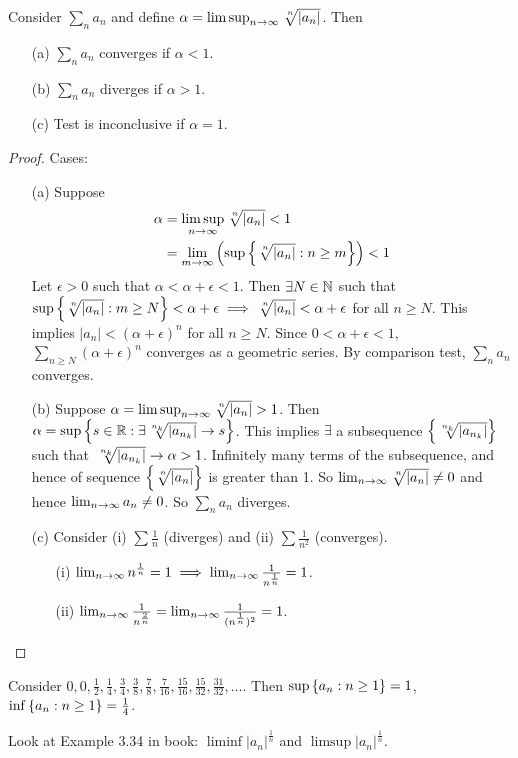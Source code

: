 \documentclass[]{article}
\begin{document}
\begin{theorem}
	 Consider $\sum_n a_n$ and define $\alpha = \limsup_{n\ra\infty} \nrt{n}{|a_n|}$.
	Then
	\begin{enumerate}
		\item[(a)] $\sum_n a_n$ converges if $\alpha<1$.
		\item[(b)] $\sum_n a_n$ diverges if $\alpha>1$.
		\item[(c)] Test is inconclusive if $\alpha = 1$.
	\end{enumerate}
\end{theorem}
\newpage
\begin{proof}
	Cases:
	\begin{enumerate}
		\item[(a)] Suppose 
			\begin{align*}
				\alpha &= \limsup_{n\ra\infty} \nrt{n}{|a_n|}<1 \\
					   &= \lim_{m\ra\infty}\left(\sup\setc{\nrt{n}{|a_n|}}{n\geq m} \right) < 1
			\end{align*}
			Let $\epsilon>0$ such that $\alpha < \alpha +\epsilon < 1$.
			Then $\exists N\in\mathbb{N}$ such that $\sup\setc{\nrt{n}{|a_n|}}{m\geq N} < \alpha+\epsilon \implies \nrt{n}{|a_n|}<\alpha+\epsilon$ for all $n\geq N$.
			This implies $|a_n|<(\alpha+\epsilon)^n$ for all $n\geq N$.
			Since $0<\alpha+\epsilon<1$, $\sum_{n\geq N}(\alpha+\epsilon)^n$ converges as a geometric series.
			By comparison test, $\sum_n a_n$ converges.
		\item[(b)] Suppose $\alpha = \limsup_{n\ra\infty} \nrt{n}{|a_n|} >1$.
			Then $\alpha = \sup\setc{s\in\mb R}{\exists \nrt{n_k}{|a_{n_k}|}\ra s}$.
			This implies $\exists$ a subsequence $\set{\nrt{n_k}{|a_{n_k}|}}$ such that $\nrt{n_k}{|a_{n_k}|}\ra \alpha > 1$.
			Infinitely many terms of the subsequence, and hence of sequence $\set{\nrt{n}{|a_n|}}$ is greater than 1.
			So $\lim_{n\ra\infty}\nrt{n}{|a_n|}\neq 0$ and hence $\lim_{n\rightarrow\infty} a_n\neq 0$.
			So $\sum_na_n$ diverges.
		\item[(c)] Consider (i) $\sum\frac1n$ (diverges) and (ii) $\sum\frac1{n^2}$ (converges).
			\begin{enumerate}
				\item[(i)] $\lim_{n\rightarrow\infty}n^\frac{1}{n} = 1\implies \lim_{n\rightarrow\infty} \frac{1}{n^\frac{1}{n}} = 1$.
				\item[(ii)] $\lim_{n\rightarrow\infty}\frac{1}{n^\frac{2}{n}} = \lim_{n\rightarrow\infty} \frac{1}{(n^\frac{1}{n})^2} = 1$.
			\end{enumerate}
	\end{enumerate}
\end{proof}

\begin{example}
	Consider $0,0,\frac{1}{2},\frac{1}{4},\frac{3}{4},\frac{3}{8},\frac{7}{8},\frac{7}{16},\frac{15}{16},\frac{15}{32},\frac{31}{32},\dots$.
	Then $\sup\left\{ a_n : n\geq 1 \right\} = 1$, $\inf\left\{ a_n : n\geq 1 \right\}=\frac{1}{4}$.
\end{example}

\begin{example}
	Look at Example 3.34 in book: $\liminf |a_n|^\frac{1}{n}$ and $\limsup |a_n|^\frac{1}{n}$.
\end{example}
\end{document}
